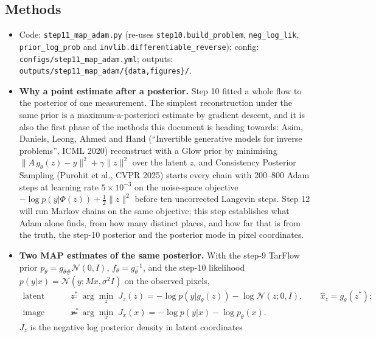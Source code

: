 \documentclass[11pt]{article}
\begin{document}
\subsection{Methods}
\begin{itemize}
  \item Code: \texttt{step11\_map\_adam.py} (re-uses
        \texttt{step10.build\_problem}, \texttt{neg\_log\_lik},
        \texttt{prior\_log\_prob} and \texttt{invlib.differentiable\_reverse});
        config: \texttt{configs/step11\_map\_adam.yml}; outputs:
        \texttt{outputs/step11\_map\_adam/\{data,figures\}/}.
  \item \textbf{Why a point estimate after a posterior.} Step 10 fitted a
        whole flow to the posterior of one measurement. The simplest
        reconstruction under the same prior is a maximum-a-posteriori
        estimate by gradient descent, and it is also the first phase of the
        methods this document is heading towards: Asim, Daniels, Leong,
        Ahmed and Hand (``Invertible generative models for inverse problems'',
        ICML 2020) reconstruct with a Glow prior by minimising
        $\|A\,g_\theta(z) - y\|^2 + \gamma\|z\|^2$ over the latent $z$, and
        Consistency Posterior Sampling (Purohit et al., CVPR 2025) starts
        every chain with 200--800 Adam steps at learning rate $5 \times
        10^{-3}$ on the noise-space objective $-\log p(y|\Phi(z)) +
        \tfrac12\|z\|^2$ before ten uncorrected Langevin steps. Step 12 will
        run Markov chains on the same objective; this step establishes what
        Adam alone finds, from how many distinct places, and how far that is
        from the truth, the step-10 posterior and the posterior mode in
        pixel coordinates.
  \item \textbf{Two MAP estimates of the same posterior.} With the step-9
        TarFlow prior $p_\theta = g_{\theta\#}\mathcal{N}(0,I)$, $f_\theta =
        g_\theta^{-1}$, and the step-10 likelihood $p(y|x) = \mathcal{N}(y;
        Mx, \sigma^2 I)$ on the observed pixels,
        \begin{align*}
          \text{latent MAP:}\quad z^{*} &= \arg\min_z\; J_z(z) =
            -\log p(y|g_\theta(z)) - \log\mathcal{N}(z;0,I), \qquad
            \hat x_z = g_\theta(z^{*});\\
          \text{image MAP:}\quad x^{*} &= \arg\min_x\; J_x(x) =
            -\log p(y|x) - \log p_\theta(x).
        \end{align*}
        $J_z$ is the negative log posterior density in latent coordinates

\end{itemize}
\end{document}
